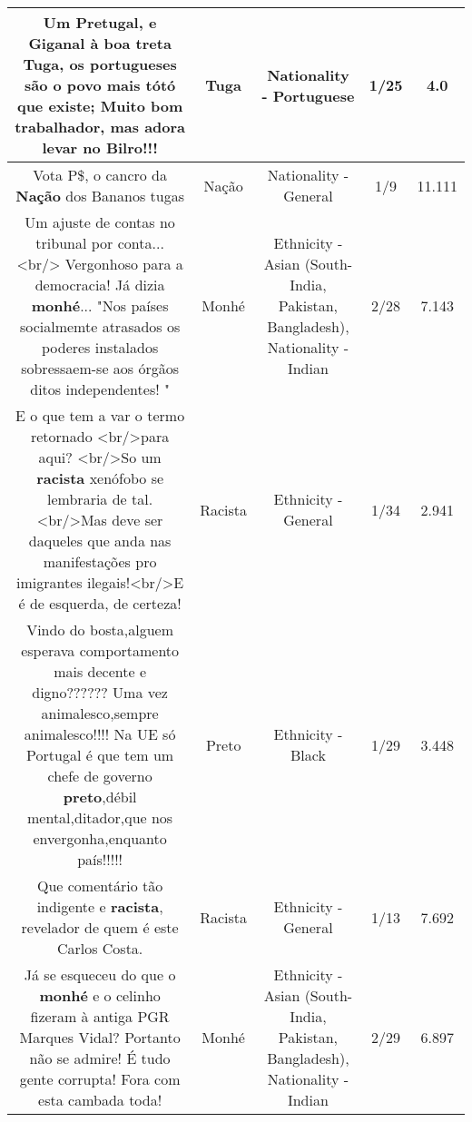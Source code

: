 \documentclass[11pt]{article}
\newlength\mylength
\begin{document}
\begin{center}
\begin{longtable}{|C{.65\mylength}|C{.30\mylength}|C{.12\mylength}|C{.12\mylength}|C{.12\mylength}|}
  \small Um Pretugal, e Giganal à boa treta \textbf{Tuga}, os portugueses são o povo mais tótó que existe; Muito bom trabalhador, mas adora levar no Bilro!!!\normalsize   & Tuga & Nationality - Portuguese & 1/25 & 4.0 \\  \hline
  \small Vota P\$, o cancro da \textbf{Nação} dos Bananos tugas\normalsize   & Nação & Nationality - General & 1/9 & 11.111 \\  \hline
  \small Um ajuste de contas no tribunal por conta...<br/> Vergonhoso para a democracia! Já dizia \textbf{m\textbf{onhé}}... "Nos países socialmemte atrasados os poderes instalados sobressaem-se aos órgãos ditos independentes! "\normalsize   & Monhé & Ethnicity - Asian (South- India, Pakistan, Bangladesh), Nationality - Indian & 2/28 & 7.143 \\  \hline
  \small E o que tem a var o termo retornado <br/>para aqui? <br/>So um \textbf{racista} xenófobo se lembraria de tal.<br/>Mas deve ser daqueles que anda nas manifestações pro imigrantes ilegais!<br/>E é de esquerda, de certeza!\normalsize   & Racista & Ethnicity - General & 1/34 & 2.941 \\  \hline
  \small Vindo do bosta,alguem esperava comportamento mais decente e digno?????? Uma vez animalesco,sempre animalesco!!!! Na UE só Portugal é que tem um chefe de governo \textbf{preto},débil mental,ditador,que nos envergonha,enquanto país!!!!!\normalsize   & Preto & Ethnicity - Black & 1/29 & 3.448 \\  \hline
  \small Que comentário tão indigente e \textbf{racista}, revelador de quem é este Carlos Costa.\normalsize   & Racista & Ethnicity - General & 1/13 & 7.692 \\  \hline
  \small Já se esqueceu do que o \textbf{m\textbf{onhé}} e o celinho fizeram à antiga PGR Marques Vidal? Portanto não se admire! É tudo gente corrupta! Fora com esta cambada toda!\normalsize   & Monhé & Ethnicity - Asian (South- India, Pakistan, Bangladesh), Nationality - Indian & 2/29 & 6.897 \\  \hline

\end{longtable}
\end{center}
\end{document}
